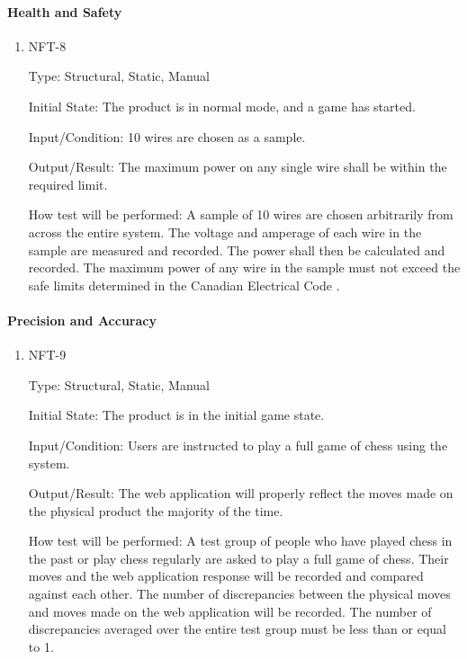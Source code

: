 \documentclass[12pt, titlepage]{article}
\begin{document}
\paragraph{Health and Safety}
\begin{enumerate}
    \item{NFT-8}

        Type: Structural, Static, Manual
                            
        Initial State: The product is in normal mode, and a game has started.
                            
        Input/Condition: 10 wires are chosen as a sample.
                            
        Output/Result: The maximum power on any single wire shall be within the required limit.
                            
        How test will be performed: A sample of 10 wires are chosen arbitrarily from across the entire system. The voltage and amperage of 
            each wire in the sample are measured and recorded. The power shall then be calculated and recorded. The maximum power of any wire
            in the sample must not exceed the safe limits determined in the Canadian Electrical Code \cite{CanadianElectricalCode2021}.
\end{enumerate}

\paragraph{Precision and Accuracy}
\begin{enumerate}
    \item{NFT-9}

        Type: Structural, Static, Manual
                            
        Initial State: The product is in the initial game state.
                            
        Input/Condition: Users are instructed to play a full game of chess using the \progname{} system.
                            
        Output/Result: The web application will properly reflect the moves made on the physical product the majority of the time.
                            
        How test will be performed: A test group of people who have played chess in the past or play chess regularly are asked to play a full game of chess. 
            Their moves and the web application response will be recorded and compared against each other. The number of discrepancies between the physical 
            moves and moves made on the web application will be recorded. The number of discrepancies averaged over the entire test group must be less than 
            or equal to 1.
\end{enumerate}
\end{document}
